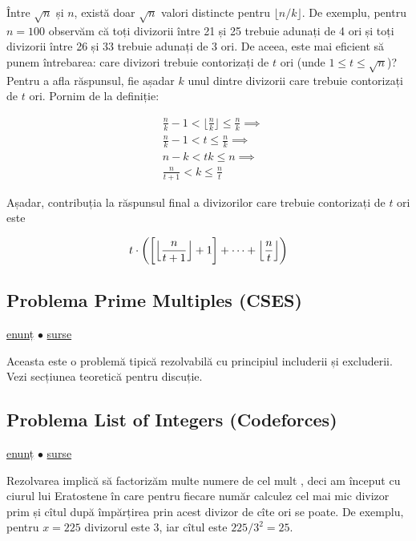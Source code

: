\documentclass[../main.tex]{subfiles}
\begin{document}
Între $\sqrt{n}$ și $n$, există doar $\sqrt{n}$ valori distincte pentru $\lfloor n/k \rfloor$. De exemplu, pentru $n=100$ observăm că toți divizorii între 21 și 25 trebuie adunați de 4 ori și toți divizorii între 26 și 33 trebuie adunați de 3 ori. De aceea, este mai eficient să punem întrebarea: care divizori trebuie contorizați de $t$ ori (unde $1 \leq t \leq \sqrt{n}$)? Pentru a afla răspunsul, fie așadar $k$ unul dintre divizorii care trebuie contorizați de $t$ ori. Pornim de la definiție:

\begin{align*}
& \frac{n}{k} - 1 < \lfloor \frac{n}{k} \rfloor \leq \frac{n}{k} \implies \\
& \frac{n}{k} - 1 < t \leq \frac{n}{k} \implies \\
& n - k < tk \leq n \implies \\
& \frac{n}{t+1} < k \leq \frac{n}{t}
\end{align*}

Așadar, contribuția la răspunsul final a divizorilor care trebuie contorizați de $t$ ori este

$$t \cdot \biggl(\biggl[\Bigl\lfloor \frac{n}{t + 1} \Bigr\rfloor + 1 \biggr] + \dots + \Bigl\lfloor \frac{n}{t} \Bigr\rfloor \biggr)$$


\subsection{Problema Prime Multiples (CSES)}
\label{problem:prime-multiples}

\href{https://cses.fi/problemset/task/2185}{enunț}
$\bullet$
\hyperref[code:prime-multiples]{surse}

Aceasta este o problemă tipică rezolvabilă cu principiul includerii și excluderii. Vezi secțiunea teoretică pentru discuție.


\subsection{Problema List of Integers (Codeforces)}
\label{problem:list-of-integers}

\href{https://codeforces.com/contest/920/problem/G}{enunț}
$\bullet$
\hyperref[code:list-of-integers]{surse}

Rezolvarea implică să factorizăm multe numere de cel mult , deci am început cu ciurul lui Eratostene în care pentru fiecare număr calculez cel mai mic divizor prim și cîtul după împărțirea prin acest divizor de cîte ori se poate. De exemplu, pentru $x=225$ divizorul este $3$, iar cîtul este $225/3^2=25$.
\end{document}
